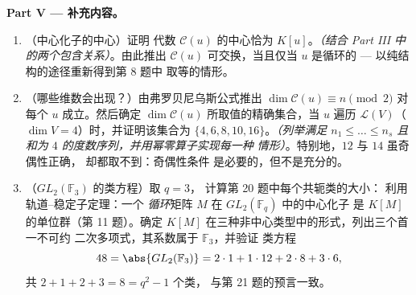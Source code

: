 \begin{problem}
\medskip
\noindent\textbf{Part V --- 补充内容。}
\begin{enumerate}[resume]
  \item （中心化子的中心）证明
        代数 $\mathcal C(u)$ 的中心恰为 $K[u]$。\emph{（结合
        Part III 中的两个包含关系）}。由此推出
        $\mathcal C(u)$ 可交换，当且仅当 $u$ 是循环的 ---
        以纯结构的途径重新得到第 8 题中
        取等的情形。
  \item （哪些维数会出现？）由弗罗贝尼乌斯公式推出
        $\dim\mathcal C(u) \equiv n \pmod 2$ 对
        每个 $u$ 成立。然后确定 $\dim \mathcal C(u)$
        所取值的精确集合，当 $u$ 遍历
        $\mathcal L(V)$（$\dim V = 4$）时，并证明该集合为 $\{4, 6,
        8, 10, 16\}$。\emph{（列举满足 $n_1
        \leq \dots \leq n_s$ 且和为 $4$ 的度数序列，并用幂零算子实现每一种
        情形）}。特别地，$12$ 与 $14$ 虽奇偶性正确，
        却都取不到：奇偶性条件
        是必要的，但不是充分的。
  \item （$GL_2(\mathbb F_3)$ 的类方程）取 $q = 3$，
        计算第 20 题中每个共轭类的大小：
        利用轨道–稳定子定理：一个
        \emph{循环}矩阵 $M$ 在 $GL_2(\mathbb F_q)$ 中的中心化子
        是 $K[M]$ 的单位群（第 11 题）。确定
        $K[M]$ 在三种非中心类型中的形式，列出三个首一不可约
        二次多项式，其系数属于 $\mathbb F_3$，并验证
        类方程
        \[
        48 = \abs{GL_2(\mathbb F_3)}
        = 2\cdot1 + 1\cdot12 + 2\cdot8 + 3\cdot6,
        \]
        共 $2 + 1 + 2 + 3 = 8 = q^2 - 1$ 个类，
        与第 21 题的预言一致。
\end{enumerate}
\end{problem}

